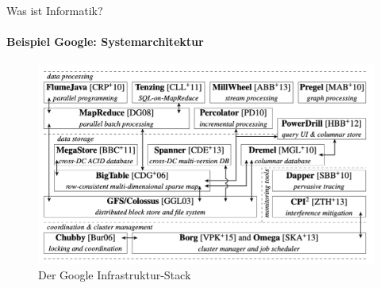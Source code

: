     \begin{frame}{Was ist Informatik?}
        \framesubtitle{Beispiel Google: Systemarchitektur}
        \begin{figure}
            \centering
            \includegraphics[width=\linewidth,height=0.6\textheight,keepaspectratio]{chapters/02_computer_science/figures/google/architecture/stack.png}
            \caption{Der Google Infrastruktur-Stack \cite{google:arch:stack}}
            \label{fig:my_label}
        \end{figure}
        
        
    \end{frame}
    

